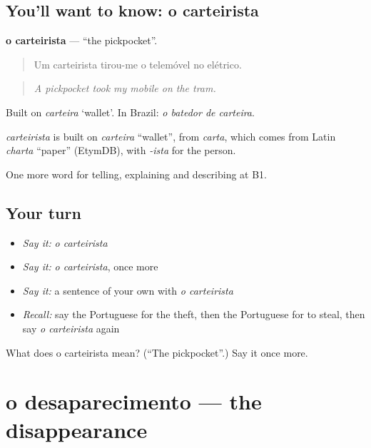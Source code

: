 \subsection*{You'll want to know: o carteirista}
\textbf{o carteirista} — \textquotedblleft{}the pickpocket\textquotedblright{}.

\begin{quote}
Um carteirista tirou-me o telemóvel no elétrico.
\end{quote}

\begin{quote}
\emph{A pickpocket took my mobile on the tram.}
\end{quote}

Built on \emph{carteira} ‘wallet’. In Brazil: \emph{o batedor de carteira}.

\begin{cousinweb}
\emph{carteirista} is built on \emph{carteira} \textquotedblleft{}wallet\textquotedblright{}, from \emph{carta}, which comes from Latin \emph{charta} \textquotedblleft{}paper\textquotedblright{} (EtymDB), with \emph{-ista} for the person.
\end{cousinweb}

\begin{grammarlens}[title={What you've built}]
One more word for telling, explaining and describing at B1.
\end{grammarlens}

\subsection*{Your turn}
\begin{itemize}
\raggedright
  \item \emph{Say it:} \emph{o carteirista}
  \item \emph{Say it:} \emph{o carteirista}, once more
  \item \emph{Say it:} a sentence of your own with \emph{o carteirista}
  \item \emph{Recall:} say the Portuguese for the theft, then the Portuguese for to steal, then say \emph{o carteirista} again
\end{itemize}

\begin{tcolorbox}[breakable,colback=teal!4,colframe=teal!35!black,title={Before you move on}]
What does o carteirista mean? (\textquotedblleft{}The pickpocket\textquotedblright{}.) Say it once more.
\end{tcolorbox}
\section[o desaparecimento]{o desaparecimento — the disappearance}

